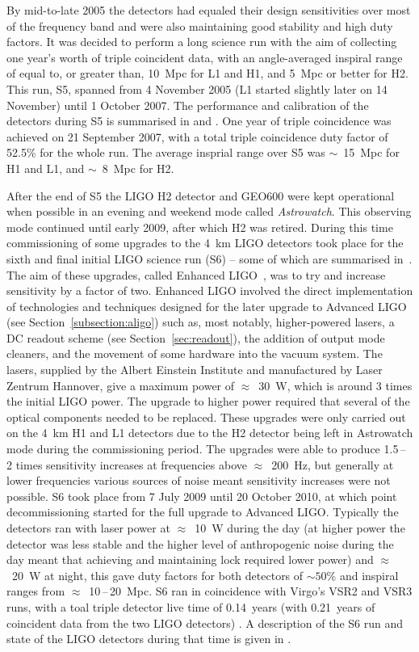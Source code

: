 By mid-to-late 2005 the detectors had equaled their design sensitivities over most of the frequency band and 
were also maintaining good stability and high duty factors. It was decided to perform a long science run with 
the aim of collecting one year's worth of triple coincident data, with an angle-averaged inspiral range of 
equal to, or greater than, 10~Mpc for L1 and H1, and 5~Mpc or better for H2. This run, S5, spanned from 4 
November 2005 (L1 started slightly later on 14 November) until 1 October 2007. The performance and 
calibration of the detectors during S5 is summarised in \cite{LIGOS5} and \cite{2010NIMPA.624..223A}. One year 
of triple coincidence was achieved on 21 September 2007, with a total triple coincidence duty factor of 52.5\% 
for the whole run. The average insprial range over S5 was $\sim$~15~Mpc for H1 and L1, and $\sim$~8~Mpc for 
H2.

After the end of S5 the LIGO H2 detector and GEO600 were kept operational when possible in an evening and 
weekend mode called \textit{Astrowatch}. This observing mode continued until early 2009, after which H2 was 
retired. During this time commissioning of some upgrades to the 4~km LIGO detectors took place for the sixth 
and final initial LIGO science run (S6) -- some of which are summarised in~\cite{Whitcomb:2008}. The aim of 
these upgrades, called Enhanced LIGO~\cite{EnhancedLIGO}, was to try and increase sensitivity by a factor of 
two. Enhanced LIGO involved the direct implementation of technologies and techniques designed for the later
upgrade to Advanced LIGO (see Section~\ref{subsection:aligo}) such as, most notably, higher-powered lasers, a 
DC readout scheme (see Section~\ref{sec:readout}), the addition of output mode cleaners, and the movement of 
some hardware into the vacuum system. The lasers, supplied by the Albert Einstein Institute and manufactured 
by Laser Zentrum Hannover, give a maximum power of $\approx$~30~W, which is around 3 times the initial LIGO 
power. The upgrade to higher power required that several of the optical components needed to be replaced. 
These upgrades were only carried out on the 4~km H1 and L1 detectors due to the H2 detector being left in 
Astrowatch mode during the commissioning period. The upgrades were able to produce 1.5\,--\,2 times 
sensitivity increases at frequencies above $\approx$~200~Hz, but generally at lower frequencies various 
sources of noise meant sensitivity increases were not possible. S6 took place from 7 July 2009
until 20 October 2010, at which point decommissioning started for the full upgrade to Advanced LIGO. 
Typically the detectors ran with laser power at $\approx$~10~W during the day (at higher power the detector
was less stable and the higher level of anthropogenic noise during the day meant that achieving and 
maintaining lock required lower power) and $\approx$~20~W at night, this gave duty factors for both 
detectors of $\sim 50$\% and inspiral ranges from $\approx$~10\,--\,20~Mpc. S6 ran in coincidence with 
Virgo's VSR2 and VSR3 runs, with a toal triple detector live time of 0.14~years (with 0.21~years of 
coincident data from the two LIGO detectors) \cite{2012PhRvD..85h2002A}. A description of the S6 run and 
state of the LIGO detectors during that time is given in \cite{2015CQGra..32k5012A}.

